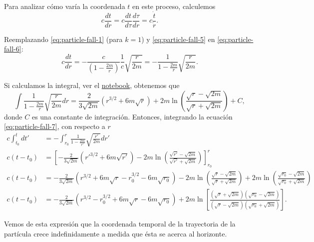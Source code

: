 \documentclass[letterpaper,11pt]{article}
\begin{document}
Para analizar cómo varía la coordenada $t$ en este proceso, calculemos
\begin{equation}
c \frac{dt}{dr} = c \frac{dt}{d\tau} \frac{d\tau}{dr} = c \frac{\dot{t}}{\dot{r}}. \label{eq:particle-fall-6}
\end{equation}

Reemplazando \eqref{eq:particle-fall-1} (para $k = 1$) y \eqref{eq:particle-fall-5} en \eqref{eq:particle-fall-6}:
\begin{equation}
c \frac{dt}{dr} = - \frac{c}{\left( 1 - \frac{2m}{r}\right)}  \frac{1}{c}\sqrt{\frac{r}{2m}} = - \frac{1}{1 - \frac{2m}{r}} \sqrt{\frac{r}{2m}}. \label{eq:particle-fall-7}
\end{equation}

Si calculamos la integral, ver  el \href{https://github.com/AleSaa66/Topicos-RG/blob/main/Semana%209/Semana-9.ipynb}{notebook}, obtenemos que
\begin{equation}
\int \frac{1}{1 - \frac{2m}{r}} \sqrt{\frac{r}{2m}} dr =  \frac{2}{3 \sqrt{2m}} \left(r^{3/2} +  6m \sqrt{r} \right) +  2m \ln\left( \frac{\sqrt{r} - \sqrt{2m}}{\sqrt{r} + \sqrt{2m}}\right) + C, 
\end{equation}
donde $C$ es una constante de integración. Entonces, integrando la ecuación \eqref{eq:particle-fall-7}, con respecto a $r$
\begin{align}
c\int_{t_0}^{t} dt' &=  - \int_{r_0}^{r} \frac{1}{1 - \frac{2m}{r'}} \sqrt{\frac{r'}{2m}} dr' \\
c(t - t_0) &= \left[-\frac{2}{3 \sqrt{2m}} \left(r'^{3/2} +  6m \sqrt{r'} \right) -  2m \ln\left( \frac{\sqrt{r'} - \sqrt{2m}}{\sqrt{r'} + \sqrt{2m}}\right)\right]_{r_0}^{r} \\
c(t - t_0) &= - \frac{2}{3\sqrt{2m}} \left( r^{3/2} +  6m \sqrt{r} - r_0^{3/2} -  6m \sqrt{r_0} \right) -  2m \ln\left( \frac{\sqrt{r} - \sqrt{2m}}{\sqrt{r} + \sqrt{2m}}\right) + 2m \ln\left( \frac{\sqrt{r_0} - \sqrt{2m}}{\sqrt{r_0} + \sqrt{2m}}\right) \\
c(t - t_0) &= - \frac{2}{3\sqrt{2m}} \left( r^{3/2} - r_0^{3/2} +  6m \sqrt{r}  -  6m \sqrt{r_0} \right) + 2m \ln\left[\frac{\left(\sqrt{r} + \sqrt{2m}\right)\left(\sqrt{r_0} - \sqrt{2m}\right)}{\left(\sqrt{r} - \sqrt{2m}\right)\left(\sqrt{r_0} + \sqrt{2m}\right)}\right].
\end{align}

Vemos de esta expresión que la coordenada temporal de la trayectoria de la partícula crece
indefinidamente a medida que ésta se acerca al horizonte.
\end{document}
